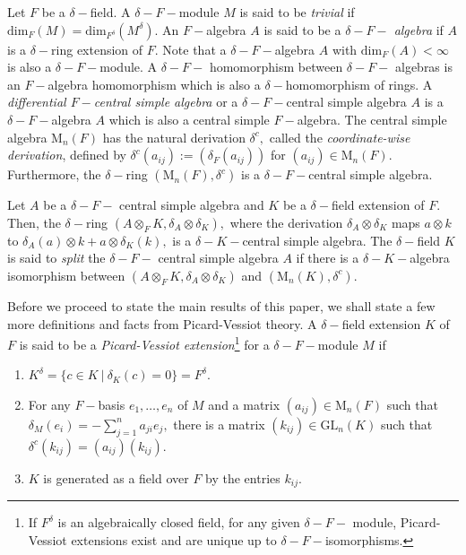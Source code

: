 \documentclass[preprint, 11pt]{amsart}
\theoremstyle{corollary}
\theoremstyle{remark}
\theoremstyle{proposition}
\numberwithin{equation}{subsection}
\begin{document}
Let $F$ be a $\delta-$field.  A $\delta-F-$module $M$ is said to be  \emph{trivial}   if $\mathrm{dim}_F(M)= \mathrm{dim}_{F^{\delta}}(M^\delta).$  
An $F-$algebra $A$ is said to be a \emph{$\delta-F-$ algebra} if $A$ is a $\delta-$ring  extension of $F.$ Note that a $\delta-F-$algebra $A$ with $\mathrm{dim}_F(A)<\infty$ is also a $\delta-F-$module. A $\delta-F-$ homomorphism between $\delta-F-$ algebras is an $F-$algebra homomorphism which is also a $\delta-$homomorphism of rings. A \emph{differential $F-$central simple algebra} or a  $\delta-F-$central simple algebra  $A$ is a $\delta-F-$algebra $A$ which is also a central simple $F-$algebra.  The central simple algebra $\mathrm{M}_n(F)$  has the natural derivation $\delta^c,$ called the \emph{coordinate-wise derivation}, defined by $\delta^c(a_{ij}):=(\delta_F(a_{ij}))$ for $(a_{ij})\in \mathrm{M}_n(F).$ Furthermore, the $\delta-$ring $(\mathrm{M}_n(F), \delta^c)$ is a  $\delta-F-$central simple algebra.

Let $A$ be a $\delta-F-$ central simple algebra and $K$ be a $\delta-$field extension of $F.$  Then,  the $\delta-$ring $(A\otimes_F K, \delta_A\otimes \delta_K),$ where the derivation $\delta_A\otimes \delta_K$  maps $a\otimes k$ to  $\delta_A(a)\otimes  k+ a\otimes \delta_K(k),$ is  a $\delta-K-$central simple algebra.  The $\delta-$field $K$ is said to \emph{split} the $\delta-F-$ central simple algebra $A$  if there is a  $\delta-K-$algebra isomorphism between   $\left(A\otimes_F K, \delta_A\otimes \delta_K \right)$ and  $\left(\mathrm{M}_n(K), \delta^c\right).$  

Before we proceed to state the main results of this paper, we shall state a few more definitions and facts from Picard-Vessiot theory. A $\delta-$field extension $K$ of $F$ is said to be a \emph{Picard-Vessiot extension}\footnote{If $F^{\delta}$  is an algebraically closed field, for any given $\delta-F-$ module,  Picard-Vessiot extensions exist and are unique up to $\delta-F-$isomorphisms.} for a $\delta-F-$module $M$ if \begin{enumerate}\item $K^{\delta}=\{c\in K\ |\ \delta_K(c)=0\}=F^{\delta}.$ \item  For any $F-$basis $e_1,\dots, e_n$ of $M$ and a matrix $(a_{ij})\in \mathrm{M}_n(F)$ such that $\delta_M(e_i)=-\sum^n_{j=1}a_{ji}e_j,$ there is a matrix $(k_{ij})\in\mathrm{GL}_n(K)$ such that $\delta^c(k_{ij})=(a_{ij})(k_{ij}).$ \item $K$ is generated as a field over $F$ by the entries $k_{ij}.$\end{enumerate}
\end{document}
